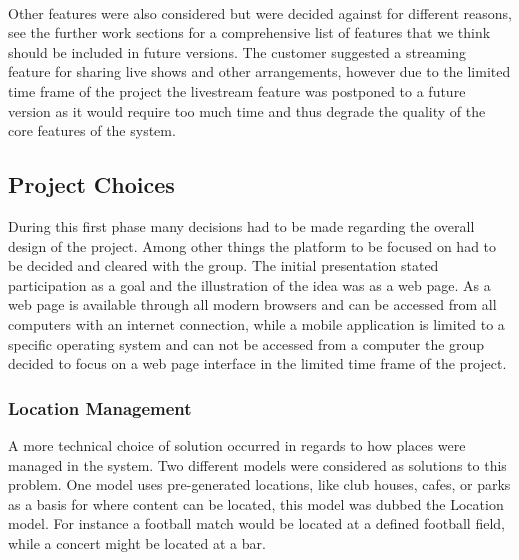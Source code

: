 \paragraph{} Other features were also considered but were decided against for different reasons, see the further work sections for a comprehensive list of features that we think should be included in future versions. The customer suggested a streaming feature for sharing live shows and other arrangements, however due to the limited time frame of the project the livestream feature was postponed to a future version as it would require too much time and thus degrade the quality of the core features of the system.

\subsection{Project Choices}
\label{subsec:PrelimWorkChoices}

During this first phase many decisions had to be made regarding the overall design of the project. Among other things the platform to be focused on had to be decided and cleared with the group. The initial presentation stated participation as a goal and the illustration of the idea was as a web page. As a web page is available through all modern browsers and can be accessed from all computers with an internet connection, while a mobile application is limited to a specific operating system and can not be accessed from a computer the group decided to focus on a web page interface in the limited time frame of the project.


\subsubsection{Location Management}
A more technical choice of solution occurred in regards to how places were managed in the system. Two different models were considered as solutions to this problem. One model uses pre-generated locations, like club houses, cafes, or parks as a basis for where content can be located, this model was dubbed the Location model. For instance a football match would be located at a defined football field, while a concert might be located at a bar.


